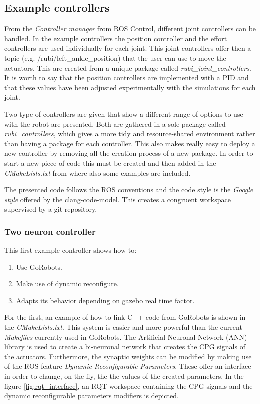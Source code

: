 
\subsection{Example controllers} %
\label{sub:example_controllers}
From the \textit{Controller manager} from ROS Control, different joint controllers can be handled.
In the example controllers the position controller and the effort controllers are used individually for each joint.
This joint controllers offer then a topic (e.g. /rubi/left\_ankle\_position) that the user can use to move the actuators.
This are created from a unique package called \textit{rubi\_joint\_controllers}.
It is worth to say that the position controllers are implemented with a PID and that these values have been adjusted experimentally with the simulations for each joint.

Two type of controllers are given that show a different range of options to use with the robot are presented.
Both are gathered in a sole package called \textit{rubi\_controllers}, which gives a more tidy and resource-shared environment rather than having a package for each controller.
This also makes really easy to deploy a new controller by removing all the creation process of a new package.
In order to start a new piece of code this must be created and then added in the \textit{CMakeLists.txt} from where also some examples are included.

The presented code follows the ROS conventions and the code style is the \textit{Google style} offered by the clang-code-model.
This creates a congruent workspace supervised by a git repository.

\subsubsection{Two neuron controller} %
\label{ssub:two_neuron_controller}
This first example controller shows how to:
\begin{enumerate}
    \item Use GoRobots.
    \item Make use of dynamic reconfigure.
    \item Adapts its behavior depending on gazebo real time factor.
\end{enumerate}
For the first, an example of how to link C++ code from GoRobots is shown in the \textit{CMakeLists.txt}.
This system is easier and more powerful than the current \textit{Makefiles} currently used in GoRobots.
The Artificial Neuronal Network (ANN) library is used to create a bi-neuronal network that creates the CPG signals of the actuators.
Furthermore, the synaptic weights can be modified by making use of the ROS feature \textit{Dynamic Reconfigurable Parameters}.
These offer an interface in order to change, on the fly, the the values of the created parameters.
In the figure \ref{fig:rqt_interface}, an RQT workspace containing the CPG signals and the dynamic reconfigurable parameters modifiers is depicted.


